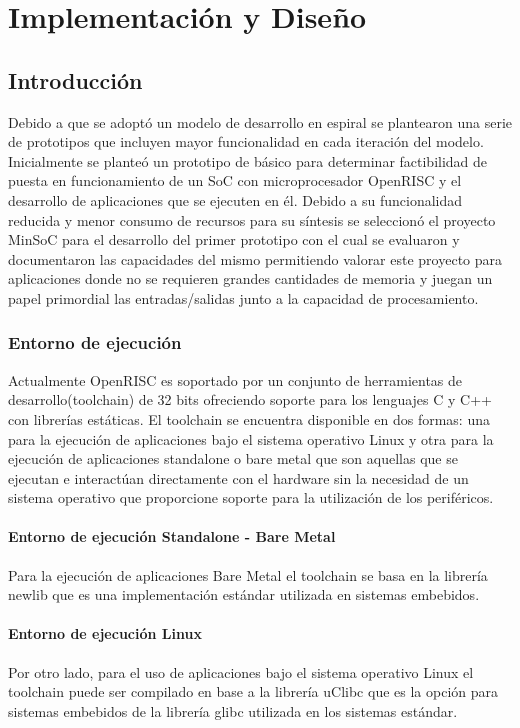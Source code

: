 \chapter{Implementación y Diseño}
	\section{Introducción}
	Debido a que se adoptó un modelo de desarrollo en espiral se plantearon una serie de prototipos que incluyen mayor funcionalidad en cada iteración
	del modelo. Inicialmente se planteó un prototipo de básico para determinar factibilidad de puesta en funcionamiento de un SoC con microprocesador
	OpenRISC y el desarrollo de aplicaciones que se ejecuten en él. Debido a su funcionalidad reducida y menor consumo de recursos  para su síntesis se
	seleccionó el proyecto MinSoC para el desarrollo del primer prototipo con el cual se evaluaron y documentaron las capacidades del mismo permitiendo
	valorar este proyecto para aplicaciones donde no se requieren grandes cantidades de memoria y juegan un papel primordial las entradas/salidas junto
	a la capacidad de procesamiento.  
		 
		\subsection{Entorno de ejecución}
		Actualmente OpenRISC es soportado por un conjunto de herramientas de desarrollo(toolchain) de 32 bits ofreciendo soporte para los lenguajes C y C++
		con librerías estáticas. El toolchain se encuentra disponible en dos formas: una para la ejecución de aplicaciones bajo el sistema operativo Linux y
		otra para la ejecución de aplicaciones standalone o bare metal que son aquellas que se ejecutan e interactúan directamente con el hardware sin la
		necesidad de un sistema operativo que proporcione soporte para la utilización de los periféricos.
		
			\subsubsection{Entorno de ejecución Standalone - Bare Metal}
	    	Para la ejecución de aplicaciones Bare Metal el toolchain se basa en la librería newlib que es una implementación estándar utilizada en
	    	sistemas embebidos. 
	    
			\subsubsection{Entorno de ejecución Linux}
			Por otro lado, para el uso de aplicaciones bajo el sistema operativo Linux el toolchain puede ser compilado en base a la librería uClibc que es la
			opción para sistemas embebidos de la librería glibc utilizada en los sistemas estándar.
		
